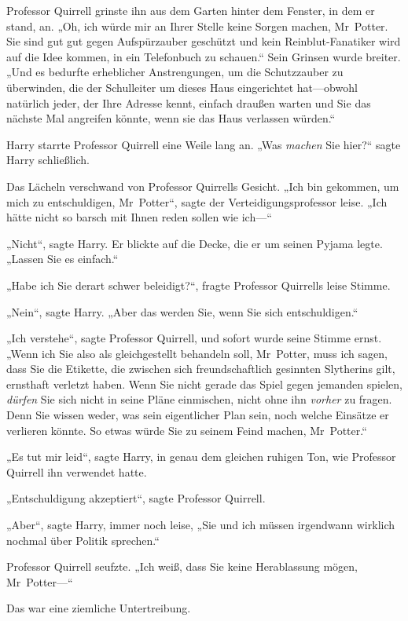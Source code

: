 {Professor Quirrell grinste ihn aus dem Garten hinter dem Fenster, in dem er stand, an. „Oh, ich würde mir an Ihrer Stelle keine Sorgen machen, Mr~Potter. Sie sind gut gut gegen Aufspürzauber geschützt und kein Reinblut-Fanatiker wird auf die Idee kommen, in ein Telefonbuch zu schauen.“ Sein Grinsen wurde breiter. „Und es bedurfte erheblicher Anstrengungen, um die Schutzzauber zu überwinden, die der Schulleiter um dieses Haus eingerichtet hat—obwohl natürlich jeder, der Ihre Adresse kennt, einfach draußen warten und Sie das nächste Mal angreifen könnte, wenn sie das Haus verlassen würden.“

Harry starrte Professor Quirrell eine Weile lang an. „Was \emph{machen} Sie hier?“ sagte Harry schließlich.

Das Lächeln verschwand von Professor Quirrells Gesicht. „Ich bin gekommen, um mich zu entschuldigen, Mr~Potter“, sagte der Verteidigungsprofessor leise. „Ich hätte nicht so barsch mit Ihnen reden sollen wie ich—“

„Nicht“, sagte Harry. Er blickte auf die Decke, die er um seinen Pyjama legte. „Lassen Sie es einfach.“

„Habe ich Sie derart schwer beleidigt?“, fragte Professor Quirrells leise Stimme.

„Nein“, sagte Harry. „Aber das werden Sie, wenn Sie sich entschuldigen.“

„Ich verstehe“, sagte Professor Quirrell, und sofort wurde seine Stimme ernst. „Wenn ich Sie also als gleichgestellt behandeln soll, Mr~Potter, muss ich sagen, dass Sie die Etikette, die zwischen sich freundschaftlich gesinnten Slytherins gilt, ernsthaft verletzt haben. Wenn Sie nicht gerade das Spiel gegen jemanden spielen, \emph{dürfen} Sie sich nicht in seine Pläne einmischen, nicht ohne ihn \emph{vorher} zu fragen. Denn Sie wissen weder, was sein eigentlicher Plan sein, noch welche Einsätze er verlieren könnte. So etwas würde Sie zu seinem Feind machen, Mr~Potter.“

„Es tut mir leid“, sagte Harry, in genau dem gleichen ruhigen Ton, wie Professor Quirrell ihn verwendet hatte.

„Entschuldigung akzeptiert“, sagte Professor Quirrell.

„Aber“, sagte Harry, immer noch leise, „Sie und ich müssen irgendwann wirklich nochmal über Politik sprechen.“

Professor Quirrell seufzte. „Ich weiß, dass Sie keine Herablassung mögen, Mr~Potter—“

Das war eine ziemliche Untertreibung.

}
